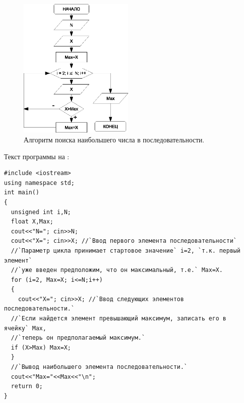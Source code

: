 \begin{figure}[htb]
\begin{center}
\includegraphics[width=0.5\textwidth]{img/ris_3_34}
\caption{Алгоритм поиска наибольшего числа в последовательности.}
\label{ch03:refDrawing33}
\end{center}
\end{figure}

Текст программы на :
\begin{lstlisting}
#include <iostream>
using namespace std;
int main()
{
  unsigned int i,N;
  float X,Max;
  cout<<"N="; cin>>N;
  cout<<"X="; cin>>X; //`Ввод первого элемента последовательности`
  //`Параметр цикла принимает стартовое значение` i=2, `т.к. первый элемент`
  //`уже введен предположим, что он максимальный, т.е.` Max=X.
  for (i=2, Max=X; i<=N;i++)
  {
    cout<<"X="; cin>>X; //`Ввод следующих элементов последовательности.`
  //`Если найдется элемент превышающий максимум, записать его в ячейку` Max, 
  //`теперь он предполагаемый максимум.`
  if (X>Max) Max=X;
  }
  //`Вывод наибольшего элемента последовательности.`
  cout<<"Max="<<Max<<"\n";
  return 0;
}
\end{lstlisting}



